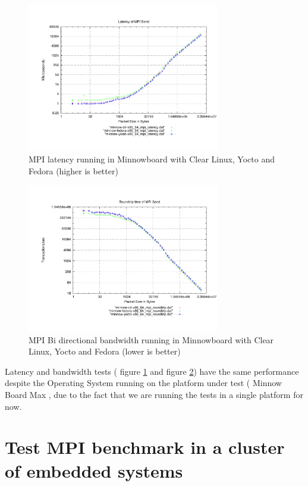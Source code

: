 \begin{figure}[H]
\centering
\includegraphics[width=0.75\textwidth]{images/mpbench_yocto_experiments/mpi_latency.pdf}
\caption{MPI latency running in Minnowboard with Clear Linux,
Yocto and Fedora (higher is better)}
\label{mpi_latency_yocto}
\end{figure}


\begin{figure}[H]
\centering
\includegraphics[width=0.75\textwidth]{images/mpbench_yocto_experiments/mpi_roundtrip.pdf}
\caption{MPI Bi directional bandwidth running in Minnowboard with Clear Linux,
Yocto and Fedora (lower is better)}
\label{mpi_roundtrip_yocto}
\end{figure}

Latency and bandwidth tests ( figure \ref{mpi_latency_yocto} and figure
\ref{mpi_roundtrip_yocto}) have the same performance despite the Operating
System running on the platform under test ( Minnow Board Max , due to the fact
that we are running the tests in a single platform for now.

\section{Test MPI benchmark in a cluster of embedded systems}


